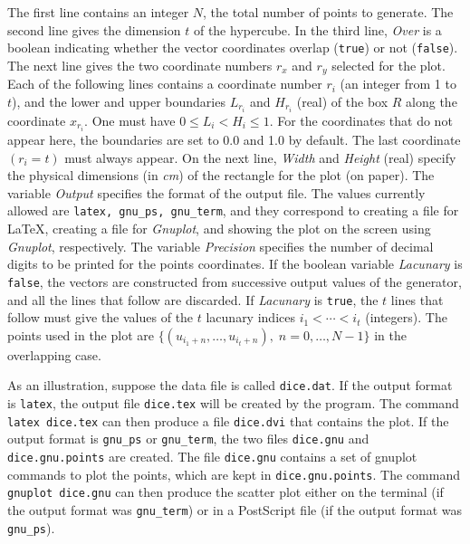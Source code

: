 The first line contains an integer $N$, the total number
of points to generate.
The second line gives the dimension $t$ of the hypercube.
In the third line, {\it Over} is a boolean indicating whether
the vector coordinates overlap ({\tt true\/}) or not ({\tt false\/}).
The next line gives the two coordinate numbers $r_x$ and $r_y$
selected for the plot.
Each of the following lines contains a coordinate number $r_i$ (an integer
from 1 to $t$), and the lower and upper boundaries $L_{r_i}$ and $H_{r_i}$
(real) of the box $R$ along the coordinate $x_{r_i}$.
One must have $0 \le L_i < H_i \le 1$.
For the coordinates that do not appear here, the boundaries are set to
0.0 and 1.0 by default.  The last coordinate $(r_i=t)$ must always appear.
On the next line, {\it Width} and {\it Height} (real)
specify the physical dimensions (in {\it cm})
of the rectangle for the plot (on paper).
The variable {\em Output\/} specifies the format of the output file.
The values currently allowed are {\tt latex, gnu\_ps, gnu\_term},
and they correspond to creating a file for \LaTeX, creating a file
for {\it Gnuplot}, and showing the plot on the screen using  {\it Gnuplot},
respectively. The variable {\em Precision\/} specifies the number of
decimal digits to be printed for the points coordinates.
If the boolean variable {\it Lacunary\/} is {\tt false},
the vectors are constructed from successive output values of the
generator, and all the lines that follow are discarded.
If {\it Lacunary\/} is {\tt true}, the $t$ lines that follow must give the
values of the $t$ lacunary indices $i_1 < \cdots < i_t$ (integers).
The points used in the plot are $\{(u_{i_1+n},\dots,u_{i_t+n}),\;
n=0,\dots,N-1\}$ in the overlapping case.

As an illustration, suppose the data file is called {\tt dice.dat}.
If the output format is {\tt latex}, the output file
 {\tt dice.tex} will be created by the program.
  The command {\tt latex dice.tex} can then produce a file
{\tt dice.dvi} that contains the plot.
If the output format is {\tt gnu\_ps} or {\tt gnu\_term},
the two files  {\tt dice.gnu} and {\tt dice.gnu.points} are
created.  The file {\tt dice.gnu} contains a set of gnuplot
commands to plot the points, which are kept in {\tt dice.gnu.points}.
The command {\tt gnuplot dice.gnu} can then produce the scatter plot
either on the terminal (if the output format was {\tt gnu\_term}) or
in a PostScript file (if the output format was {\tt gnu\_ps}).



